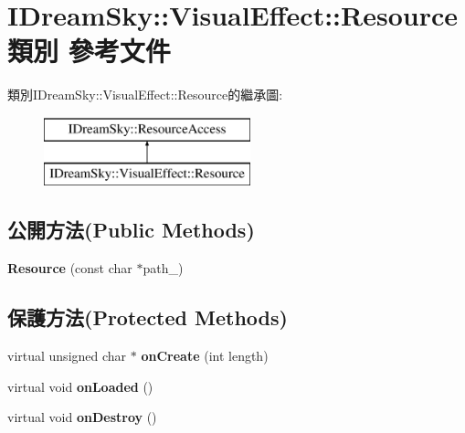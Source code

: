 \hypertarget{class_i_dream_sky_1_1_visual_effect_1_1_resource}{}\section{I\+Dream\+Sky\+:\+:Visual\+Effect\+:\+:Resource 類別 參考文件}
\label{class_i_dream_sky_1_1_visual_effect_1_1_resource}
類別\+I\+Dream\+Sky\+:\+:Visual\+Effect\+:\+:Resource的繼承圖\+:\begin{figure}[H]
\begin{center}
\leavevmode
\includegraphics[height=2.000000cm]{class_i_dream_sky_1_1_visual_effect_1_1_resource}
\end{center}
\end{figure}
\subsection*{公開方法(Public Methods)}
\begin{DoxyCompactItemize}
\item 
{\bfseries Resource} (const char $\ast$path\+\_\+)\hypertarget{class_i_dream_sky_1_1_visual_effect_1_1_resource_acc74e34cb2fb33d37598019b0ba9bba5}{}\label{class_i_dream_sky_1_1_visual_effect_1_1_resource_acc74e34cb2fb33d37598019b0ba9bba5}

\end{DoxyCompactItemize}
\subsection*{保護方法(Protected Methods)}
\begin{DoxyCompactItemize}
\item 
virtual unsigned char $\ast$ {\bfseries on\+Create} (int length)\hypertarget{class_i_dream_sky_1_1_visual_effect_1_1_resource_a5a0be9c94e9f0e149dd31466e8919d5b}{}\label{class_i_dream_sky_1_1_visual_effect_1_1_resource_a5a0be9c94e9f0e149dd31466e8919d5b}

\item 
virtual void {\bfseries on\+Loaded} ()\hypertarget{class_i_dream_sky_1_1_visual_effect_1_1_resource_a40357ce505eaf1a57490f944090f8a39}{}\label{class_i_dream_sky_1_1_visual_effect_1_1_resource_a40357ce505eaf1a57490f944090f8a39}

\item 
virtual void {\bfseries on\+Destroy} ()\hypertarget{class_i_dream_sky_1_1_visual_effect_1_1_resource_abcc591eeb985ac7ba27f16373dd393c6}{}\label{class_i_dream_sky_1_1_visual_effect_1_1_resource_abcc591eeb985ac7ba27f16373dd393c6}

\end{DoxyCompactItemize}
